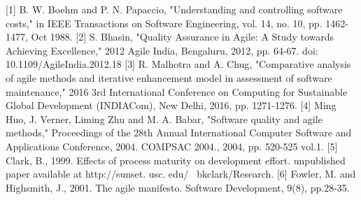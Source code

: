 \documentclass{scrartcl}
\begin{document}


[1] B. W. Boehm and P. N. Papaccio, "Understanding and controlling software costs," in IEEE Transactions on Software Engineering, vol. 14, no. 10, pp. 1462-1477, Oct 1988.
[2] S. Bhasin, "Quality Assurance in Agile: A Study towards Achieving Excellence," 2012 Agile India, Bengaluru, 2012, pp. 64-67.
doi: 10.1109/AgileIndia.2012.18
[3] R. Malhotra and A. Chug, "Comparative analysis of agile methods and iterative enhancement model in assessment of software maintenance," 2016 3rd International Conference on Computing for Sustainable Global Development (INDIACom), New Delhi, 2016, pp. 1271-1276.
[4] Ming Huo, J. Verner, Liming Zhu and M. A. Babar, "Software quality and agile methods," Proceedings of the 28th Annual International Computer Software and Applications Conference, 2004. COMPSAC 2004., 2004, pp. 520-525 vol.1.
[5] Clark, B., 1999. Effects of process maturity on development effort. unpublished paper available at http://sunset. usc. edu/~ bkclark/Research.
[6] Fowler, M. and Highsmith, J., 2001. The agile manifesto. Software Development, 9(8), pp.28-35.
\end{document}
